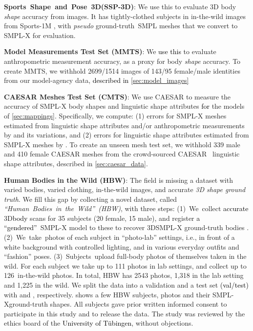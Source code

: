 \documentclass[10pt,twocolumn,letterpaper]{article}
\newcommand{\qheading}[1]{\noindent\textbf{#1}:}
\newcommand{\TODO}[1]{\xspace{\color{red} #1}\xspace}
\renewcommand{\TODO}[1]{\xspace{\color{black} #1}\xspace}
\newcommand{\AtoS}{\text{\mbox{A2S}}\xspace}
\newcommand{\StoA}{\text{\mbox{S2A}}\xspace}
\newcommand{\threeD}{3D\xspace}
\newcommand{\mmts}{MMTS\xspace}
\newcommand{\cmts}{CMTS\xspace}
\newcommand{\ssp}{\mbox{SSP-\threeD}\xspace}
\newcommand{\ssplong}{\mbox{Sports Shape and Pose \threeD}\xspace}
\newcommand{\hbw}{\mbox{HBW}\xspace}
\newcommand{\colorNUMB}{black}
\newcommand{\hbwNumberSubjects}{{\color{\colorNUMB}35}\xspace}
\newcommand{\hbwNumberSubjectsM}{{\color{\colorNUMB}15}\xspace}
\newcommand{\hbwNumberSubjectsF}{{\color{\colorNUMB}20}\xspace}
\newcommand{\hbwNumberPhotos}{{\color{\colorNUMB}2543}\xspace}
\newcommand{\hbwNumberPhotosLab}{{\color{\colorNUMB}1,318}\xspace}
\newcommand{\hbwNumberPhotosWild}{{\color{\colorNUMB}1,225}\xspace}
\newcommand{\hbwNumberPhotosLabTHRESHperSubj}{{\color{\colorNUMB}111}\xspace}
\newcommand{\hbwNumberPhotosWildTHRESHperSubj}{{\color{\colorNUMB}126}\xspace}
\newcommand{\hbwNumberSPLITSsubj}{{\color{\colorNUMB}{10/25 subjects (6/14 female 4/11 male)}}\xspace}
\newcommand{\hbwNumberSPLITSimg}{{\color{\colorNUMB}{781/1,762 images (432/983 female 349/779 male)}}\xspace}
\newcommand{\smplx}{\mbox{SMPL-X}\xspace}
\newcommand{\smplX}{\smplx}
\newcommand{\groundtruth}{\mbox{ground-truth}\xspace}
\newcommand{\smpl}{\mbox{SMPL}\xspace}
\newcommand{\caesar}{\mbox{CAESAR}\xspace}
\newcommand{\inthewild}{\mbox{in-the-wild}\xspace}
\renewcommand{\ie}{\mbox{i.e.}\xspace}
\newcommand{\cameraready}[1]{\textcolor{Fuchsia}{{#1}}\xspace}
\renewcommand{\cameraready}[1]{\textcolor{black}{{#1}}\xspace}
\newcommand{\colorTERM}{blue}
\renewcommand{\colorTERM}{black}
\newcommand{\measurement}[0]{{\color{\colorTERM}anthropometric measurement}\xspace}
\newcommand{\measurements}[0]{{\color{\colorTERM}anthropometric measurements}\xspace}
\newcommand{\linguisticshapeattributes}[0]{{\color{\colorTERM}linguistic shape attributes}\xspace}
\begin{document}
\qheading{\ssplong (\ssp)\cite{sengupta2020straps}}
We use this to evaluate \threeD body \emph{shape} accuracy  from images. 
It has  tightly-clothed subjects in  \inthewild images from 
\mbox{Sports-1M} \cite{KarpathyCVPR14}, 
with \emph{pseudo} \groundtruth~\smpl meshes that we \TODO{convert} to \smplX for evaluation. 


\qheading{Model Measurements Test Set (\mmts)}
We \cameraready{use this}
to evaluate 
\measurement accuracy,
as a proxy for body \emph{shape} accuracy.
To create \mmts, we withhold
2699/1514 images of 143/95 female/male identities from our 
model-agency
data, \cameraready{described in \cref{sec:model_images}}


\qheading{\caesar Meshes Test Set (\cmts)} 
We use \caesar to measure the accuracy of \smplX body shapes and \linguisticshapeattributes
\cameraready{for} 
the models
of \cref{sec:mappings}.
Specifically, we compute:
(1) errors for \smplx meshes estimated from \linguisticshapeattributes and/or \measurements by \AtoS and its variations, and
(2) errors for \linguisticshapeattributes estimated from \smplX meshes by \StoA.
To create an unseen mesh test set, we withhold 339 male and 410 female \caesar meshes from the crowd-sourced \caesar~ \linguisticshapeattributes, described in \cref{sec:caesar_data}.


\qheading{Human Bodies in the Wild (\hbw)}
The field is missing a dataset with
varied bodies, varied clothing, \inthewild images, and accurate \emph{\threeD shape ground truth}. 
We fill this gap by collecting a novel dataset, 
called
\mbox{\emph{``Human Bodies in the Wild'' (\hbw)}}, 
with three steps: \mbox{(1)     We collect} \cameraready{accurate} \threeD \cameraready{body} scans for \hbwNumberSubjects subjects (\hbwNumberSubjectsF female, \hbwNumberSubjectsM male), and register \cameraready{a ``gendered''}~\smplX model to these to recover \threeD \smplX ground-truth bodies \cameraready{\cite{Dyna}}. 
\mbox{(2)     We take photos} of each subject in ``photo-lab'' settings, \ie, in front of a white background with controlled lighting, and in various everyday outfits and ``fashion'' poses. 
\mbox{(3)     Subjects upload} full-body photos of themselves taken in the wild. For each subject we take up to \hbwNumberPhotosLabTHRESHperSubj photos in lab settings, and collect up to \hbwNumberPhotosWildTHRESHperSubj~\inthewild photos. 
In total, \hbw has \hbwNumberPhotos photos, \hbwNumberPhotosLab in the lab setting and  \hbwNumberPhotosWild in the wild. 
We split the data into a validation and a test set \cameraready{(val/test)} with 
\hbwNumberSPLITSsubj
and 
\hbwNumberSPLITSimg, 
respectively.
 shows a few \hbw subjects, photos and their \smplX \groundtruth shapes.
All subjects gave prior written informed consent to participate in this study and to release the data. The study was reviewed by the 
ethics board 
of the \cameraready{University of T{\"ubingen}}, without objections.
\end{document}
